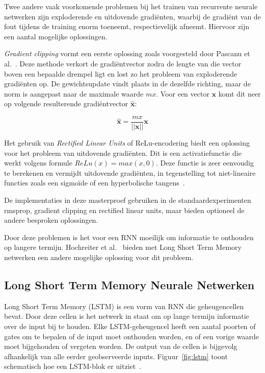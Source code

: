 Twee andere vaak voorkomende problemen bij het trainen van recurrente neurale netwerken zijn exploderende en uitdovende gradi\"enten, waarbij de gradi\"ent van de fout tijdens de training enorm toeneemt, respectievelijk afneemt. Hiervoor zijn een aantal mogelijke oplossingen.

\emph{Gradient clipping} vormt een eerste oplossing zoals voorgesteld door Pascanu et al.~\cite{Pascanu2012}. Deze methode verkort de gradi\"entvector zodra de lengte van die vector boven een bepaalde drempel ligt en lost zo het probleem van exploderende gradi\"enten op. De gewichtsupdate vindt plaats in de dezelfde richting, maar de norm is aangepast naar de maximale waarde $mx$. Voor een vector $\mathbf{x}$ komt dit neer op volgende resulterende gradi\"entvector $\mathbf{\hat{x}}$:

\begin{equation}
    \mathbf{\hat{x}} = \frac{mx}{||\mathbf{x}||}\mathbf{x}
\end{equation}

Het gebruik van \emph{Rectified Linear Units} of ReLu-encodering biedt een oplossing voor het probleem van uitdovende gradi\"enten. Dit is een activatiefunctie die werkt volgens formule $ReLu(x) = max(x,0)$. Deze functie is zeer eenvoudig te berekenen en vermijdt uitdovende gradi\"enten, in tegenstelling tot niet-lineaire functies zoals een sigmo\"ide of een hyperbolische tangens~\cite{Glorot2011}.

De implementaties in deze masterproef gebruiken in de standaardexperimenten rmsprop, gradient clipping en rectified linear units, maar bieden optioneel de andere besproken oplossingen.

Door deze problemen is het voor een RNN moeilijk om informatie te onthouden op langere termijn. Hochreiter et al.~\cite{SeppHochreiter1997} bieden met Long Short Term Memory netwerken een andere mogelijke oplossing voor dit probleem.

\subsection{Long Short Term Memory Neurale Netwerken}
\label{sub:lstm}
Long Short Term Memory (LSTM) is een vorm van RNN die geheugencellen bevat. Door deze cellen is het netwerk in staat om op lange termijn informatie over de input bij te houden. Elke LSTM-geheugencel heeft een aantal poorten of gates om te bepalen of de input moet onthouden worden, en of een vorige waarde moet bijgehouden of vergeten worden. De output van de cellen is bijgevolg afhankelijk van alle eerder geobserveerde inputs. Figuur~\ref{fig:lstm} toont schematisch hoe een LSTM-blok er uitziet~\cite{SeppHochreiter1997,Google}.

